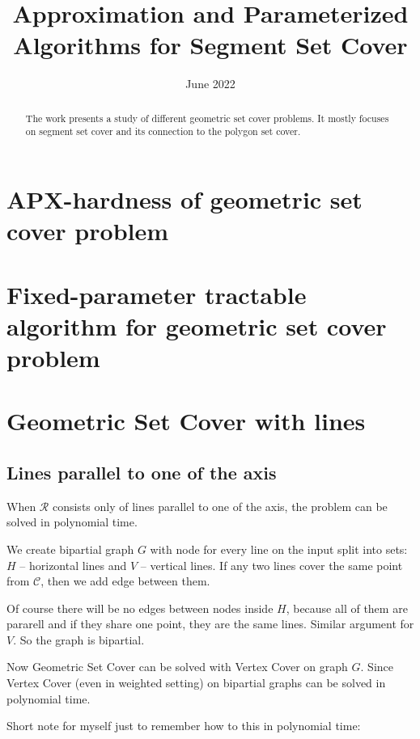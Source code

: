 \documentclass[en]{pracamgr}
\title{Approximation and Parameterized Algorithms for Segment Set Cover}
\date{June 2022}
\theoremstyle{plain}
\theoremstyle{definition}
\begin{document}
\maketitle

\begin{abstract}
  The work presents a study
  of different geometric set cover problems.
  It mostly focuses on segment set cover
  and its connection to the polygon set cover.
\end{abstract}

\tableofcontents


\chapter{APX-hardness of geometric set cover problem}

\chapter{Fixed-parameter tractable algorithm for geometric set cover problem}




\chapter{Geometric Set Cover with lines}
\section{Lines parallel to one of the axis}
When $\mathcal{R}$ consists only of lines parallel to
one of the axis, the problem can be solved in
polynomial time.

We create bipartial graph $G$ with node for every line on the input
split into sets: $H$ -- horizontal lines and $V$ -- vertical lines.
If any two lines cover the same point from $\mathcal{C}$, then
we add edge between them.

Of course there will be no edges between nodes inside $H$,
because all of them are pararell and if they share 
one point, they are the same lines. Similar argument for $V$.
So the graph is bipartial.

Now Geometric Set Cover can be solved with Vertex Cover on graph $G$.
Since Vertex Cover (even in weighted setting) 
on bipartial graphs can be solved in polynomial time.

Short note for myself just to remember how to this in polynomial time:
\end{document}
